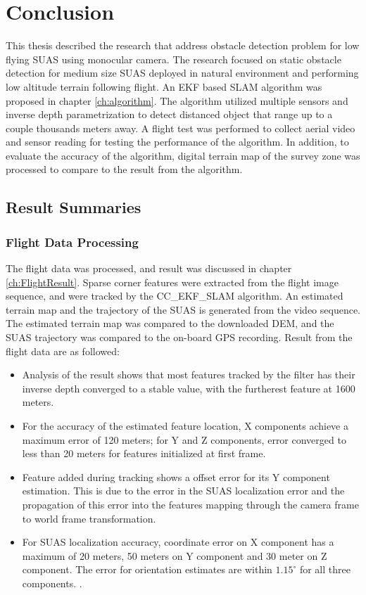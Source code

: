 \chapter{Conclusion}\label{ch:conclusion}

This thesis described the research that address obstacle
detection problem for low flying SUAS using monocular camera. The
research focused on static obstacle detection for medium size SUAS
deployed in natural environment and performing low altitude terrain
following flight.  An EKF based SLAM algorithm was
proposed in chapter \ref{ch:algorithm}. The algorithm utilized
multiple sensors and inverse depth parametrization to detect distanced
object that range up to a couple thousands meters away. A flight test
was performed to collect aerial video and sensor reading for testing
the performance of the algorithm. In addition, to evaluate the
accuracy of the algorithm, digital terrain map of the survey zone was
processed to compare to the result from the algorithm. 

\section{Result Summaries}
\subsection{Flight Data Processing}
The flight data was processed, and result was discussed in chapter
\ref{ch:FlightResult}. Sparse corner features were extracted from the
flight image sequence, and were tracked by the CC\_EKF\_SLAM
algorithm. An estimated terrain map and the trajectory of the SUAS is
generated from the video sequence. The estimated terrain map was
compared to the downloaded DEM, and the SUAS trajectory was compared
to the on-board GPS recording. Result from the flight data are as
followed:
\begin{itemize}
  \item Analysis of the result shows that most features tracked by the
  filter has their inverse depth converged to a stable value, with the
  furtherest feature at 1600 meters.
  \item For the accuracy of the estimated feature location, X
  components achieve a maximum error of 120 meters; for Y and Z
  components, error converged to less than 20 meters for features
  initialized at first frame.
  \item Feature added during tracking shows a offset error for its Y
  component estimation. This is due to the error in the SUAS
  localization error and the propagation of this error into the
  features mapping through the camera frame to world frame
  transformation.
  \item For SUAS localization accuracy, coordinate error on X
  component has a maximum of 20 meters, 50 meters on Y component and
  30 meter on Z component. The error for orientation estimates are
  within $1.15^\circ$ for all three components. .
\end{itemize}

